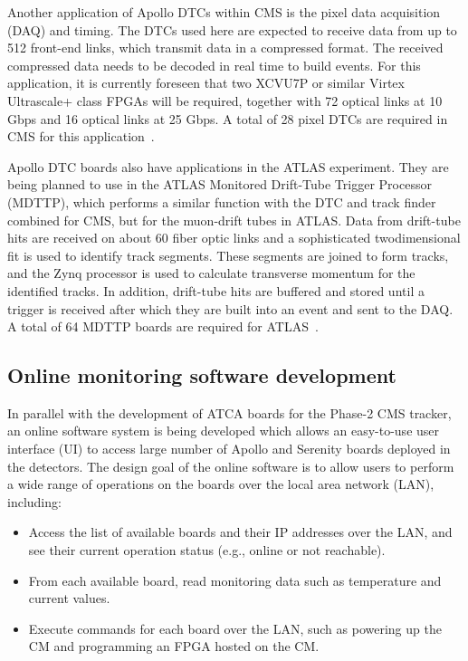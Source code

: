 Another application of Apollo DTCs within CMS is the pixel data acquisition (DAQ) and timing.
The DTCs used here are expected to receive data from up to 512 front-end links, which transmit
data in a compressed format. The received compressed data needs to be decoded in real time
to build events. For this application, it is currently foreseen that  two XCVU7P or similar Virtex 
Ultrascale+ class FPGAs will be required, together with 72 optical links at 10 Gbps and 16 optical 
links at 25 Gbps. A total of 28 pixel DTCs are required in CMS for this application~\cite{CMS:ApolloPaper}.

Apollo DTC boards also have applications in the ATLAS experiment. They are being planned to use
in the ATLAS  Monitored Drift-Tube Trigger Processor (MDTTP), which performs a similar function
with the DTC and track finder combined for CMS, but for the muon-drift tubes in ATLAS. Data from drift-tube
hits are received on about 60 fiber optic links and a sophisticated twodimensional fit is used to identify track segments. 
These segments are joined to form tracks, and
the Zynq processor is used to calculate transverse momentum for the identified tracks. In addition,
drift-tube hits are buffered and stored until a trigger is received after which they are built into an
event and sent to the DAQ. A total of 64 MDTTP boards are required for ATLAS~\cite{CMS:ApolloPaper}.

\subsection{Online monitoring software development}

In parallel with the development of ATCA boards for the Phase-2 CMS tracker, an online software system is being
developed which allows an easy-to-use user interface (UI) to access large number of Apollo and Serenity boards
deployed in the detectors. The design goal of the online software is to allow users to perform a wide range of 
operations on the boards over the local area network (LAN), including:

\begin{itemize}
    \item Access the list of available boards and their IP addresses over the LAN, and see their current operation status
    (e.g., online or not reachable).
    \item From each available board, read monitoring data such as temperature and current values.
    \item Execute commands for each board over the LAN, such as powering up the CM and programming an FPGA hosted on the CM.
\end{itemize}


